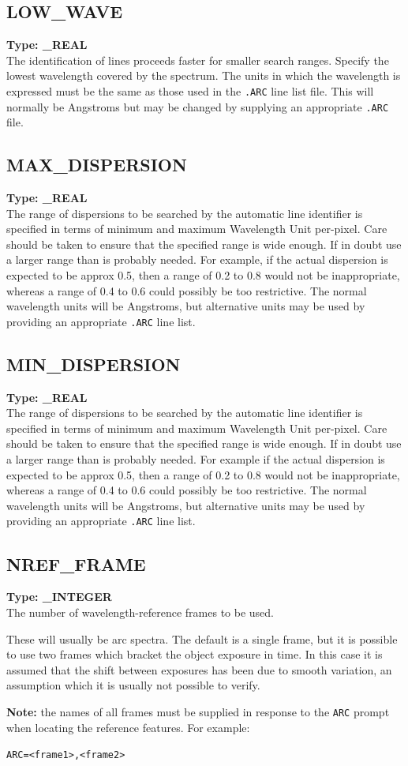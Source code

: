 \documentclass[11pt,twoside]{article}
\makeatletter
\newcommand{\stardocinitials}  {SUN}
\newcommand{\stardocnumber}    {152.4}
\newcommand{\stardocname}{\stardocinitials /\stardocnumber}
\newcommand{\htmlref}[2]{#1}
\newcommand{\xlabel}[1]{}
\newcommand{\indexcmdname}[1]{\index{#1@\protect\cmdname{#1}}}
\renewcommand{\indexcmdname}[1]{}
\newcommand{\cmdname}{\begingroup \catcode`\_=12 \realcmdname}
\newcommand{\realcmdname}[1]{\endgroup\texttt{#1}}
\newcommand{\echparameter}[4]
{
\item [#1 = #3] \mbox{}\label{par_#2}\indexcmdname{#2}
\\
#4
}
\renewcommand{\echparameter}[4]
{
  \subsection{\xlabel{par_#2}\label{par_#2}{\bf #1}}
  {\bf Type: #3}\\
#4
}
\makeatother
\begin{document}
\markboth{PARAMETERS: L}{\stardocname}
\echparameter{LOW\_WAVE}{LOW_WAVE}{
 \_REAL
}{
 The identification of lines proceeds faster for smaller search
 ranges.  Specify the lowest wavelength covered by the spectrum.  The
 units in which the wavelength is expressed must be the same as those
 used in the \texttt{.ARC} line list file.  This will normally be Angstroms
 but may be changed by supplying an appropriate \texttt{.ARC} file.
}

\echparameter{MAX\_DISPERSION}{MAX_DISPERSION}{
 \_REAL
}{
 The range of dispersions to be searched by the automatic line
 identifier is specified in terms of minimum and maximum Wavelength
 Unit per-pixel.  Care should be taken to ensure that the specified
 range is wide enough.  If in doubt use a larger range than is
 probably needed.  For example, if the actual dispersion is expected
 to be approx 0.5, then a range of 0.2 to 0.8 would not be
 inappropriate, whereas a range of 0.4 to 0.6 could possibly be too
 restrictive.  The normal wavelength units will be Angstroms, but
 alternative units may be used by providing an appropriate \texttt{.ARC} line
 list.
}

\markboth{PARAMETERS: M}{\stardocname}
\echparameter{MIN\_DISPERSION}{MIN_DISPERSION}{
 \_REAL
}{
 The range of dispersions to be searched by the automatic line
 identifier is specified in terms of minimum and maximum Wavelength
 Unit per-pixel.  Care should be taken to ensure that the specified
 range is wide enough. If in doubt use a larger range than is
 probably needed.  For example if the actual dispersion is expected
 to be approx 0.5, then a range of 0.2 to 0.8 would not be
 inappropriate, whereas a range of 0.4 to 0.6 could possibly be too
 restrictive.  The normal wavelength units will be Angstroms, but
 alternative units may be used by providing an appropriate \texttt{.ARC} line
 list.
}

\echparameter{NREF\_FRAME}{NREF_FRAME}{
 \_INTEGER
}{
 The number of wavelength-reference frames to be used.

 These will usually be arc spectra.  The default is a single frame,
 but it is possible to use two frames which bracket the object
 exposure in time.  In this case it is assumed that the shift
 between exposures has been due to smooth variation, an assumption
 which it is usually not possible to verify.

 {\bf Note:} the names of all frames must be supplied in response to the
 \htmlref{\texttt{ARC}}{par_ARC} prompt when locating the reference features.
 For example:

 \texttt{\space\space  ARC=<frame1>,<frame2>}
}
\end{document}
